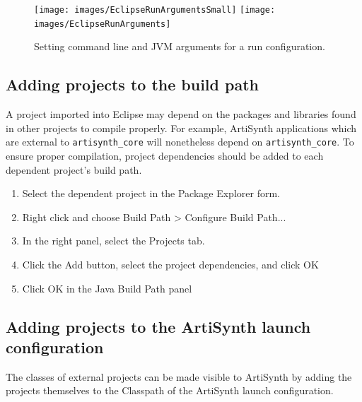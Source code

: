 \begin{figure}
\begin{center}
\iflatexml
\texttt{[image: images/EclipseRunArgumentsSmall]}
\else
\texttt{[image: images/EclipseRunArguments]}
\fi
\end{center}
\caption{Setting command line and JVM arguments for a run configuration.}%
\label{EclipseRunArguments:fig}
\end{figure}


\subsection{Adding projects to the build path}
\label{AddingProjectsToBuildPath}

A project imported into Eclipse may depend on the packages and
libraries found in other projects to compile properly.  For example,
ArtiSynth applications which are external to {\tt artisynth\_core}
will nonetheless depend on {\tt artisynth\_core}. To ensure proper
compilation, project dependencies should be added to each dependent
project's build path.

\begin{enumerate}

\item Select the dependent project in the {\sf Package Explorer} form.

\item Right click and choose {\sf Build Path > Configure Build Path...} 

\item In the right panel, select the {\sf Projects} tab.

\item Click the {\sf Add} button, select the project dependencies,
      and click {\sf OK}

\item Click {\sf OK} in the Java Build Path panel

\end{enumerate}

\subsection{Adding projects to the ArtiSynth launch configuration}
\label{AddingProjectsToLaunch}

The classes of external projects can be made visible to ArtiSynth by
adding the projects themselves to the Classpath of the ArtiSynth launch
configuration.

